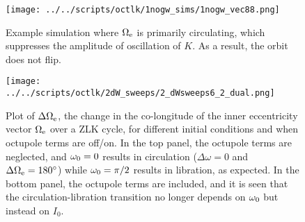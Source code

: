 \documentclass[
        fleqn,
        usenatbib,
    ]{mnras}
\newlength{\colummwidth}
\begin{document}
\begin{figure}
    \centering
    \texttt{[image: ../../scripts/octlk/1nogw\_sims/1nogw\_vec88.png]}
    \caption{Example simulation where $\Omega_{\rm e}$ is primarily circulating,
    which suppresses the amplitude of oscillation of $K$. As a result, the orbit
    does not flip.}\label{fig:nogw_circ}
\end{figure}
\begin{figure}
    \centering
    \texttt{[image: ../../scripts/octlk/2dW\_sweeps/2\_dWsweeps6\_2\_dual.png]}
    \caption{Plot of $\Delta \Omega_{\rm e}$, the change in the co-longitude of
    the inner eccentricity vector $\Omega_{\rm e}$ over a ZLK cycle, for
    different initial conditions and when octupole terms are off/on. In the top
    panel, the octupole terms are neglected, and $\omega_{\rm 0} = 0$ results in
    circulation ($\Delta \omega = 0$ and $\Delta \Omega_{\rm e} = 180^\circ$)
    while $\omega_{\rm 0} = \pi / 2$ results in libration, as expected. In the
    bottom panel, the octupole terms are included, and it is seen that the
    circulation-libration transition no longer depends on $\omega_{\rm 0}$ but
    instead on $I_0$. }\label{fig:dW}
\end{figure}

\label{lastpage} %
\end{document}
